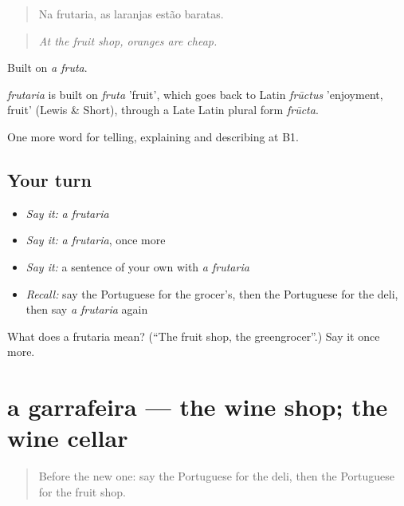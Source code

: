 \begin{quote}
Na frutaria, as laranjas estão baratas.
\end{quote}

\begin{quote}
\emph{At the fruit shop, oranges are cheap.}
\end{quote}

Built on \emph{a fruta}.

\begin{cousinweb}
\emph{frutaria} is built on \emph{fruta} 'fruit', which goes back to Latin \emph{frūctus} 'enjoyment, fruit' (Lewis \& Short), through a Late Latin plural form \emph{frūcta}.
\end{cousinweb}

\begin{grammarlens}[title={What you've built}]
One more word for telling, explaining and describing at B1.
\end{grammarlens}

\subsection*{Your turn}
\begin{itemize}
\raggedright
  \item \emph{Say it:} \emph{a frutaria}
  \item \emph{Say it:} \emph{a frutaria}, once more
  \item \emph{Say it:} a sentence of your own with \emph{a frutaria}
  \item \emph{Recall:} say the Portuguese for the grocer's, then the Portuguese for the deli, then say \emph{a frutaria} again
\end{itemize}

\begin{tcolorbox}[breakable,colback=teal!4,colframe=teal!35!black,title={Before you move on}]
What does a frutaria mean? (\textquotedblleft{}The fruit shop, the greengrocer\textquotedblright{}.) Say it once more.
\end{tcolorbox}
\section[a garrafeira]{a garrafeira — the wine shop; the wine cellar}

\label{lesson:PT-C450-garrafeira}



\begin{quote}
Before the new one: say the Portuguese for the deli, then the Portuguese for the fruit shop.
\end{quote}

